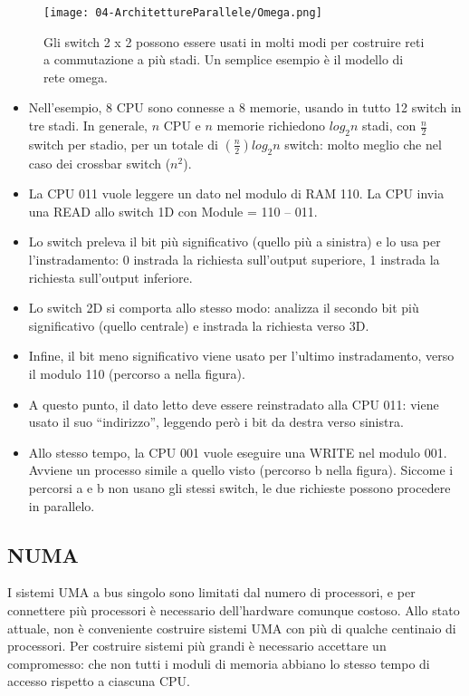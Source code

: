 \begin{figure}[h]
    \centering
    \texttt{[image: 04-ArchitettureParallele/Omega.png]}
    \caption{Gli switch 2 x 2 possono essere usati in molti modi per costruire reti
a commutazione a più stadi. Un semplice esempio è il modello di
rete omega.}
\end{figure}

\begin{itemize}
  \item Nell’esempio, 8 CPU sono connesse a 8 memorie, usando in tutto
12 switch in tre stadi. In generale, $n$ CPU e $n$ memorie richiedono
$log_2n$ stadi, con $\frac{n}{2}$ switch per stadio, per un totale di $(\frac{n}{2})log_2n$
switch: molto meglio che nel caso dei crossbar switch ($n^2$). 
\item La CPU 011
vuole leggere un dato nel modulo di RAM 110. La CPU invia una
READ allo switch 1D con Module = 110 -- 011. 
\item Lo switch preleva il bit più significativo (quello più a sinistra) e lo
usa per l’instradamento: 0 instrada la richiesta sull’output superiore,
1 instrada la richiesta sull’output inferiore. 
\item Lo switch 2D si comporta allo stesso modo: analizza il secondo bit
più significativo (quello centrale) e instrada la richiesta verso 3D. 
\item Infine, il bit meno significativo viene usato per l’ultimo
instradamento, verso il modulo 110 (percorso a nella figura). 
\item A questo punto, il dato letto deve essere reinstradato alla CPU 011:
viene usato il suo “indirizzo”, leggendo però i bit da destra verso
sinistra. 
\item Allo stesso tempo, la CPU 001 vuole eseguire una WRITE nel
modulo 001. Avviene un processo simile a quello visto (percorso b
nella figura). Siccome i percorsi a e b non usano gli stessi switch, le
due richieste possono procedere in parallelo. 
\end{itemize}


\subsection{NUMA}

I sistemi UMA a bus singolo sono limitati dal numero di processori,
e per connettere più processori è necessario dell’hardware
comunque costoso. Allo stato attuale, non è conveniente costruire
sistemi UMA con più di qualche centinaio di processori. Per costruire sistemi più grandi è necessario accettare un
compromesso: che non tutti i moduli di memoria abbiano
lo stesso tempo di accesso rispetto a ciascuna CPU.


